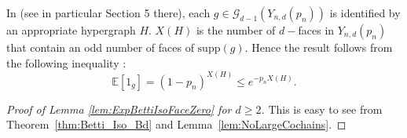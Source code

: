 \documentclass[12pt]{amsart}
\numberwithin{equation}{section}
\numberwithin{theorem}{section}
\newcommand{\1}{\mathbf{1}}
\def\G{\mathcal{G}}
\def\EP{\mathbb{E}}
\def\supp{\mathrm{supp}}
\begin{document}
In \cite{kahle2014inside} (see in particular Section 5 there), each $g \in \G_{d - 1}(Y_{n, d}(p_n))$ is identified by an appropriate hypergraph $H.$ $X(H)$ is the number of $d-$faces in $Y_{n, d}(p_n)$ that contain an odd number of faces of $\supp(g).$ Hence the result follows from the following inequality :
%
\[
\EP[1_g] = (1 - p_n)^{X(H)} \leq e^{-p_n X(H)}.
\]
%		

\begin{proof}[Proof of Lemma \ref{lem:ExpBettiIsoFaceZero} for $d \geq 2$]
This is easy to see from Theorem~\ref{thm:Betti_Iso_Bd} and Lemma~\ref{lem:NoLargeCochains}.
\end{proof}




\end{document}

